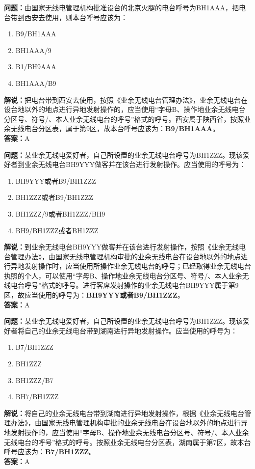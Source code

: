 \textbf{问题：}由国家无线电管理机构批准设台的北京火腿的电台呼号为BH1AAA，把电台带到西安去使用，则本台呼号应该为：
\begin{enumerate}[label=\Alph*), leftmargin=1cm]
	\item B9/BH1AAA
	\item BH1AAA/9
	\item B1/BH9AAA
	\item BH1AAA/B9
\end{enumerate}
\textbf{解说：}把电台带到西安去使用，按照《业余无线电台管理办法》，业余无线电台在设台地以外的地点进行异地发射操作的，应当使用“字母B、操作地业余无线电台分区号、符号/、本人业余无线电台的呼号”格式的呼号。西安属于陕西省，按照业余无线电台分区表，属于第9区，故本台呼号应该为：\textbf{B9/BH1AAA}。\\\textbf{答案：}A

\textbf{问题：}某业余无线电爱好者，自己所设置的业余无线电台呼号为BH1ZZZ。现该爱好者到业余无线电台BH9YYY做客并在该台进行发射操作。应当使用的呼号为：
\begin{enumerate}[label=\Alph*), leftmargin=1cm]
	\item BH9YYY或者B9/BH1ZZZ
	\item BH1ZZZ或者B9/BH1ZZZ
	\item BH1ZZZ/9或者BH1ZZZ/BH9
	\item BH9/BH1ZZZ或者BH1ZZZ
\end{enumerate}
\textbf{解说：}到业余无线电台BH9YYY做客并在该台进行发射操作，按照《业余无线电台管理办法》，由国家无线电管理机构审批的业余无线电台在设台地以外的地点进行异地发射操作时，应当使用所操作业余无线电台的呼号；已经取得业余无线电台执照的个人，可以使用“字母B、操作地业余无线电台分区号、符号/、本人业余无线电台呼号”格式的呼号。进行客席发射操作的业余无线电台BH9YYY属于第9区，故应当使用的呼号为：\textbf{BH9YYY或者B9/BH1ZZZ}。\\\textbf{答案：}A

\textbf{问题：}某业余无线电爱好者，自己所设置的业余无线电台呼号为BH1ZZZ。现该爱好者将自己的业余无线电台带到湖南进行异地发射操作。应当使用的呼号为：
\begin{enumerate}[label=\Alph*), leftmargin=1cm]
	\item B7/BH1ZZZ
	\item BH1ZZZ
	\item BH1ZZZ/B7
	\item BH7/BH1ZZZ
\end{enumerate}
\textbf{解说：}将自己的业余无线电台带到湖南进行异地发射操作，根据《业余无线电台管理办法》，由国家无线电管理机构审批的业余无线电台在设台地以外的地点进行异地发射操作的，应当使用“字母B、操作地业余无线电台分区号、符号/、本人业余无线电台的呼号”格式的呼号。按照业余无线电台分区表，湖南属于第7区，故本台呼号应该为：\textbf{B7/BH1ZZZ}。\\\textbf{答案：}A

